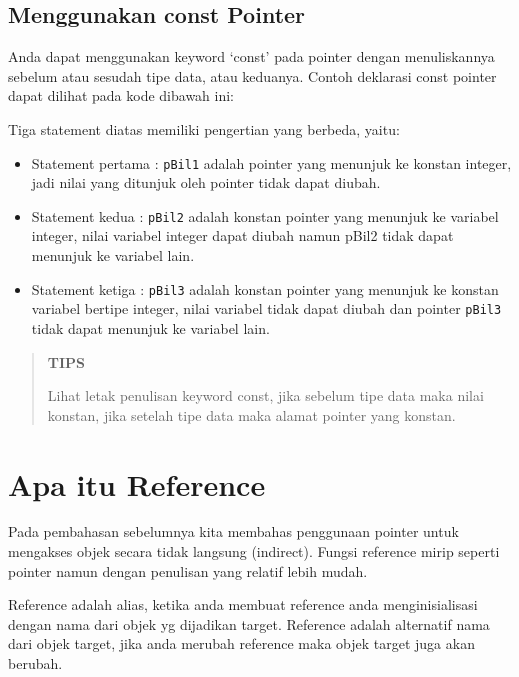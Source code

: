 \subsection{Menggunakan const Pointer}\label{menggunakan-const-pointer}

Anda dapat menggunakan keyword `const' pada pointer dengan menuliskannya
sebelum atau sesudah tipe data, atau keduanya. Contoh deklarasi const
pointer dapat dilihat pada kode dibawah ini:



Tiga statement diatas memiliki pengertian yang berbeda, yaitu:

\begin{itemize}

\item
 Statement pertama : \texttt{pBil1} adalah pointer yang menunjuk ke
 konstan integer, jadi nilai yang ditunjuk oleh pointer tidak dapat
 diubah.
\item
 Statement kedua : \texttt{pBil2} adalah konstan pointer yang menunjuk
 ke variabel integer, nilai variabel integer dapat diubah namun pBil2
 tidak dapat menunjuk ke variabel lain.
\item
 Statement ketiga : \texttt{pBil3} adalah konstan pointer yang menunjuk
 ke konstan variabel bertipe integer, nilai variabel tidak dapat diubah
 dan pointer \texttt{pBil3} tidak dapat menunjuk ke variabel lain.
\end{itemize}

\begin{quotation}
{\LARGE {}} \textbf{TIPS}

	Lihat
	letak penulisan keyword const, jika sebelum tipe data maka nilai
	konstan, jika setelah tipe data maka alamat pointer yang konstan.
\end{quotation}


\section{Apa itu Reference}\label{apa-itu-reference}

Pada pembahasan sebelumnya kita membahas penggunaan pointer untuk
mengakses objek secara tidak langsung (indirect). Fungsi reference mirip
seperti pointer namun dengan penulisan yang relatif lebih mudah.

Reference adalah alias, ketika anda membuat reference anda
menginisialisasi dengan nama dari objek yg dijadikan target. Reference
adalah alternatif nama dari objek target, jika anda merubah reference
maka objek target juga akan berubah.

